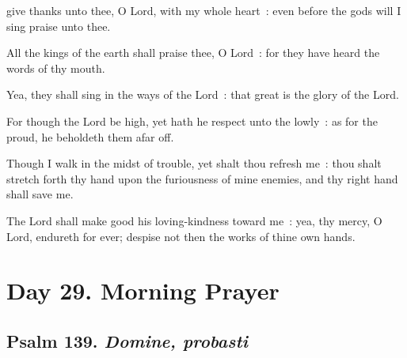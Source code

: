  give thanks unto thee, O Lord, with my whole heart~: even before the gods will I sing praise unto thee.\par
{}
All the kings of the earth shall praise thee, O Lord~: for they have heard the words of thy mouth.\par
{}Yea, they shall sing in the ways of the Lord~: that great is the glory of the Lord.\par
{}For though the Lord be high, yet hath he respect unto the lowly~: as for the proud, he beholdeth them afar off.\par
{}Though I walk in the midst of trouble, yet shalt thou refresh me~: thou shalt stretch forth thy hand upon the furiousness of mine enemies, and thy right hand shall save me.\par
{}The Lord shall make good his loving-kindness toward me~: yea, thy mercy, O Lord, endureth for ever; despise not then the works of thine own hands.\par

\vspace{-0.5\baselineskip}

\section*{Day 29. Morning Prayer}

\vspace{-0.4\baselineskip}

\subsection{Psalm 139. \textit{Domine, probasti}}

\vspace{-0.1\baselineskip}

